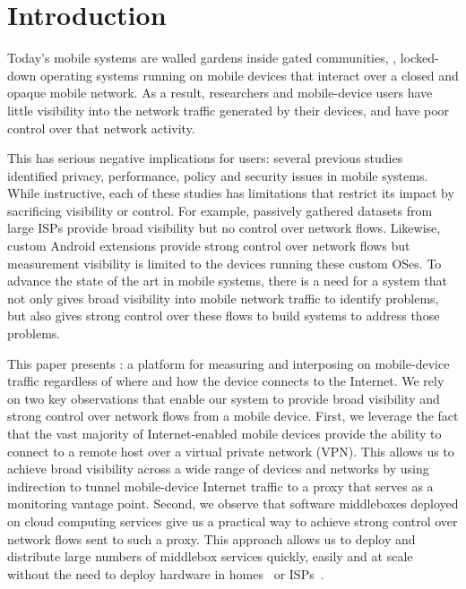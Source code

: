 \section{Introduction}
\label{sec:introduction}

Today's mobile systems are walled gardens inside gated communities, \ie{}, locked-down operating systems 
running on mobile devices that interact over a closed and opaque mobile network. As a result, 
researchers and mobile-device users have little visibility into the network traffic generated by their devices, and have 
poor control over that network activity. 

This has serious negative implications for users: several previous studies~\cite{vallina-rod:ads,gerber:passivespeed,chen:wifi,enck:taintdroid,wang:middleboxes,sommers:cellwifi} 
identified privacy, performance, policy and security issues in mobile systems. While instructive, each of these studies 
has limitations that restrict its impact by sacrificing visibility or control. For example, passively gathered datasets from large 
ISPs provide broad visibility but no control over network flows. Likewise, custom Android extensions provide 
strong control over network flows but measurement visibility is limited to the devices running these custom OSes. 
To advance the state of the art in mobile systems, there is a need for a system that not only gives 
broad visibility into mobile network traffic to identify problems, but also gives strong control over these flows 
to build systems to address those problems. 

This paper presents \meddle:  a platform for measuring and interposing on mobile-device 
traffic regardless of where and how the device connects to the Internet. We rely on two key observations 
that enable our system to provide broad visibility and strong control over network flows from a mobile device. 
First, we 
 leverage the fact that 
the vast majority of Internet-enabled mobile devices provide the ability to connect to a remote host over a virtual private 
network (VPN). This allows us to achieve broad visibility across a wide range of devices and networks by using indirection 
to tunnel mobile-device Internet traffic to a proxy that serves as a monitoring vantage point.
Second, we observe that  
software middleboxes deployed on cloud computing services give us a practical way to achieve strong control over 
network flows sent to such a proxy. This approach allows us to deploy and distribute large numbers 
of middlebox services quickly, easily and at scale~\cite{sherry:middleboxes} without 
the need to deploy hardware in homes~\cite{bismarck} or ISPs~\cite{wang:middleboxes}. 

